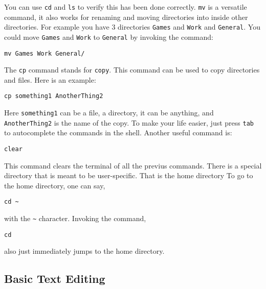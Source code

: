 \documentclass[a4paper, 12pt]{report}
\begin{document}
\begin{center}
You can use \texttt{cd} and \texttt{ls} to verify this has been done correctly. \texttt{mv} is a versatile command, it also works for renaming and moving directories into inside other directories. For example you have $3$ directories \texttt{Games} and \texttt{Work} and \texttt{General}. You could move \texttt{Games} and \texttt{Work} to \texttt{General} by invoking the command:
\begin{lstlisting}
mv Games Work General/
\end{lstlisting}
The \texttt{cp} command stands for \texttt{copy}. This command can be used to copy directories and files. Here is an example:
\begin{lstlisting}
cp something1 AnotherThing2
\end{lstlisting}
Here \texttt{something1} can be a file, a directory, it can be anything, and \texttt{AnotherThing2} is the name of the copy. To make your life easier, just press \texttt{tab} to autocomplete the commands in the shell. Another useful command is:
\begin{lstlisting}
clear
\end{lstlisting}
This command clears the terminal of all the previus commands. There is a special directory that is meant to be user-specific. That is the home directory To go to the home directory, one can say,
\begin{lstlisting}
cd ~
\end{lstlisting}
with the \texttt{\~} character. Invoking the command,
\begin{lstlisting}
cd
\end{lstlisting}
also just immediately jumps to the home directory.

\subsection{Basic Text Editing}
\begin{comment}
\end{comment}




\end{center}
\end{document}
